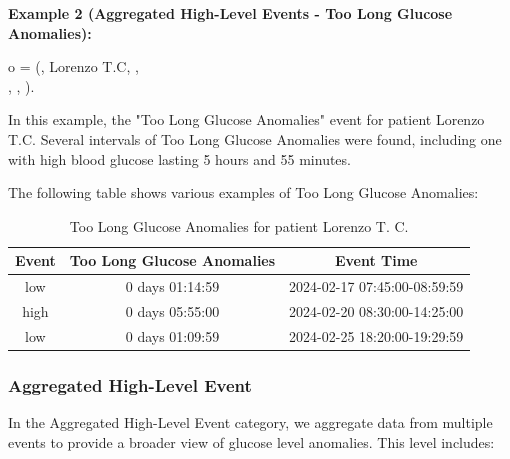 \documentclass{article}
\begin{document}
\begin{enumerate}
    \textbf{Example 2 (Aggregated High-Level Events - Too Long Glucose Anomalies):}
    
     o = (, Lorenzo T.C,    , \\ , , ).
     
    In this example, the "Too Long Glucose Anomalies" event for patient Lorenzo T.C. Several intervals of Too Long Glucose Anomalies were found, including one with high blood glucose lasting 5 hours and 55 minutes.
    
    The following table shows various examples of Too Long Glucose Anomalies:

    \begin{table}[h!]
        \centering
        \begin{tabular}{|c|c|c|}
            \hline
            \textbf{Event} & \textbf{Too Long Glucose Anomalies} & \textbf{Event Time} \\
            \hline
            low & 0 days 01:14:59 & 2024-02-17 07:45:00-08:59:59 \\ 
            \hline
            high & 0 days 05:55:00 & 2024-02-20 08:30:00-14:25:00 \\
            \hline
            low & 0 days 01:09:59 & 2024-02-25 18:20:00-19:29:59 \\
            \hline
        \end{tabular}
        \caption{Too Long Glucose Anomalies for patient Lorenzo T. C.}
        \label{tab:too_long_glucose_anomalies}
    \end{table}

\end{enumerate}

\subsubsection{Aggregated High-Level Event}

In the Aggregated High-Level Event category, we aggregate data from multiple events to provide a broader view of glucose level anomalies. This level includes:
\end{document}
